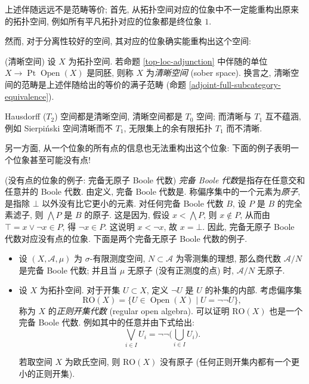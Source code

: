 上述伴随远远不是范畴等价; 首先, 从拓扑空间对应的位象中不一定能重构出原来的拓扑空间, 例如所有平凡拓扑对应的位象都是终位象 $1$.

然而, 对于分离性较好的空间, 其对应的位象确实能重构出这个空间:
\begin{definition}
	{(清晰空间)}
	设 $X$ 为拓扑空间. 若命题 \ref{top-loc-adjunction} 中伴随的单位 $X \to \operatorname{Pt}\operatorname{Open}(X)$ 是同胚,
	则称 $X$ 为\emph{清晰空间} (sober space\footnotemark). 换言之, 清晰空间的范畴是上述伴随给出的等价的满子范畴 (命题 \ref{adjoint-full-subcategory-equivalence}).
\end{definition}

\begin{prop}
	{}
	Hausdorff ($T_2$) 空间都是清晰空间, 清晰空间都是 $T_0$ 空间; 而清晰与 $T_1$ 互不蕴涵, 例如 Sierpi\'nski 空间清晰而不 $T_1$, 无限集上的余有限拓扑 $T_1$ 而不清晰.
\end{prop}

另一方面, 从一个位象的所有点的信息也无法重构出这个位象: 下面的例子表明一个位象甚至可能没有点!

\begin{example}
	[label={complete-atomless-Boolean-algebra}]
	{(没有点的位象的例子: 完备无原子 Boole 代数)}
	\emph{完备 Boole 代数}是指存在任意交和任意并的 Boole 代数.
	由定义, 完备 Boole 代数是\fm.
	称偏序集中的一个元素为\emph{原子}, 是指除 $\bot$ 以外没有比它更小的元素.
	对任何完备 Boole 代数 $B$, 设 $P$ 是 $B$ 的完全素滤子,
	则 $\bigwedge P$ 是 $B$ 的原子. 这是因为, 假设 $x < \bigwedge P$,
	则 $x\notin P$, 从而由 $\top=x\vee\neg x\in P$, 得 $\neg x \in P$. 这说明 $x<\neg x$, 故 $x=\bot$.
	因此, 完备无原子 Boole 代数对应没有点的位象.
	下面是两个完备无原子 Boole 代数的例子.
	
	\begin{itemize}
		\item 设 $(X,\mathcal A,\mu)$ 为 $\sigma$-有限测度空间, $N\subset \mathcal A$ 为零测集的理想,
		那么商代数 $\mathcal A / N$ 是完备 Boole 代数; 并且当 $\mu$ 无原子 (没有正测度的点) 时, $\mathcal A/N$ 无原子.
		\item	
	设 $X$ 为拓扑空间. 对于开集 $U\subset X$, 定义 $\neg U$ 是 $U$ 的补集的内部.
	考虑偏序集
	$$
	\text{RO}(X)
	=
	\big\{U\in\operatorname{Open}(X)\mid U = \neg\neg U\big\},
	$$
	称为 $X$ 的\emph{正则开集代数} (regular open algebra). 可以证明 $\text{RO}(X)$ 也是一个完备 Boole 代数\footnotemark. 例如其中的任意并由下式给出:
	$$
	\bigvee_{i\in I}U_i = \neg\neg\Big(\bigcup_{i\in I}U_i\Big).
	$$
	
	若取空间 $X$ 为欧氏空间, 则 $\text{RO}(X)$ 没有原子 (任何正则开集内都有一个更小的正则开集).
	\end{itemize}
\end{example}

